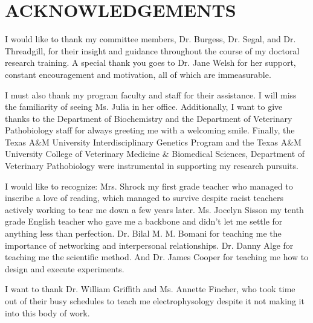 %
%
%


\chapter*{ACKNOWLEDGEMENTS}


\indent I would like to thank my committee members, Dr. Burgess, Dr. Segal, and Dr. Threadgill, for their insight and guidance throughout the course of my doctoral research training. A special thank you goes to Dr. Jane Welsh for her support, constant encouragement and motivation, all of which are immeasurable.

I must also thank my program faculty and staff for their assistance. I will miss the familiarity of seeing Ms. Julia in her office. Additionally, I want to give thanks to the Department of Biochemistry and the Department of Veterinary Pathobiology staff for always greeting me with a welcoming smile. Finally, the Texas A\&M University Interdisciplinary Genetics Program and the Texas A\&M University College of Veterinary Medicine \& Biomedical Sciences, Department of Veterinary Pathobiology were instrumental in supporting my research pursuits.

I would like to recognize:
Mrs. Shrock my first grade teacher who managed to inscribe a love of reading, which managed to survive despite racist teachers actively working to tear me down a few years later.
Ms. Jocelyn Sisson my tenth grade English teacher who gave me a backbone and didn't let me settle for anything less than perfection.
Dr. Bilal M. M. Bomani for teaching me the importance of networking and interpersonal relationships.
Dr. Danny Alge for teaching me the scientific method.
And Dr. James Cooper for teaching me how to design and execute experiments.

I want to thank Dr. William Griffith and Ms. Annette Fincher, who took time out of their busy schedules to teach me electrophysology despite it not making it into this body of work.

